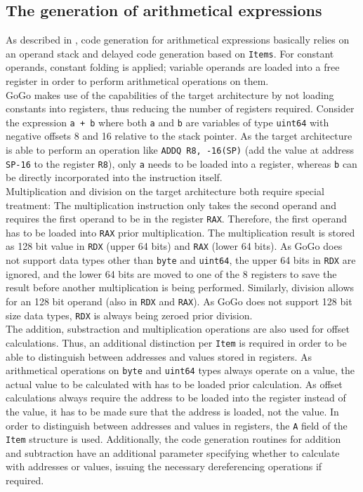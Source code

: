 \documentclass[a4paper]{scrartcl}
\let\section\subsection
\let\subsection\subsubsection
\let\subsubsection\paragraph
\let\paragraph\subparagraph
\let\subparagraph\undefined
\begin{document}
    \section{The generation of arithmetical expressions}
      As described in \cite{wir96}, code generation for arithmetical expressions basically relies on an operand stack and delayed code generation based on \texttt{Items}. For constant operands, constant folding is applied; variable operands are loaded into a free register in order to perform arithmetical operations on them.\\
      GoGo makes use of the capabilities of the target architecture by not loading constants into registers, thus reducing the number of registers required. Consider the expression \texttt{a + b} where both \texttt{a} and \texttt{b} are variables of type \texttt{uint64} with negative offsets 8 and 16 relative to the stack pointer. As the target architecture is able to perform an operation like \texttt{ADDQ R8, -16(SP)} (add the value at address \texttt{SP-16} to the register \texttt{R8}), only \texttt{a} needs to be loaded into a register, whereas \texttt{b} can be directly incorporated into the instruction itself.\\
      Multiplication and division on the target architecture both require special treatment: The multiplication instruction only takes the second operand and requires the first operand to be in the register \texttt{RAX}\cite{int09}. Therefore, the first operand has to be loaded into \texttt{RAX} prior multiplication. The multiplication result is stored as 128 bit value in \texttt{RDX} (upper 64 bits) and \texttt{RAX} (lower 64 bits). As GoGo does not support data types other than \texttt{byte} and \texttt{uint64}, the upper 64 bits in \texttt{RDX} are ignored, and the lower 64 bits are moved to one of the 8 registers to save the result before another multiplication is being performed. Similarly, division allows for an 128 bit operand (also in \texttt{RDX} and \texttt{RAX}). As GoGo does not support 128 bit size data types, \texttt{RDX} is always being zeroed prior division.\\
      The addition, substraction and multiplication operations are also used for offset calculations. Thus, an additional distinction per \texttt{Item} is required in order to be able to distinguish between addresses and values stored in registers. As arithmetical operations on \texttt{byte} and \texttt{uint64} types always operate on a value, the actual value to be calculated with has to be loaded prior calculation. As offset calculations always require the address to be loaded into the register instead of the value, it has to be made sure that the address is loaded, not the value. In order to distinguish between addresses and values in registers, the \texttt{A} field of the \texttt{Item} structure is used. Additionally, the code generation routines for addition and subtraction have an additional parameter specifying whether to calculate with addresses or values, issuing the necessary dereferencing operations if required.
\end{document}
